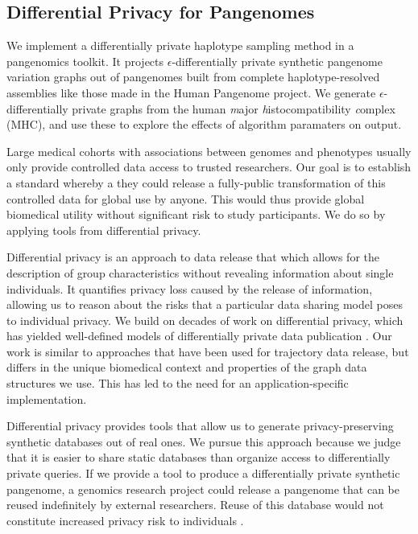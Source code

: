 \subsection{Differential Privacy for Pangenomes}
We implement a differentially private haplotype sampling method in a pangenomics toolkit. 
It projects $\epsilon$-differentially private synthetic pangenome variation graphs out of pangenomes built from complete haplotype-resolved assemblies like those made in the Human Pangenome project. 
We generate $\epsilon$-differentially private graphs from the human \textit{m}ajor \textit{h}istocompatibility \textit{c}omplex (MHC), and use these to explore the effects of algorithm paramaters on output.

Large medical cohorts with associations between genomes and phenotypes usually only provide controlled data access to trusted researchers. Our goal is to establish a standard whereby a they could release a fully-public transformation of this controlled data for global use by anyone. This would thus provide global biomedical utility without significant risk to study participants. We do so by applying tools from differential privacy.

Differential privacy is an approach to data release that which allows for the description of group characteristics without revealing information about single individuals. It quantifies privacy loss caused by the release of information, allowing us to reason about the risks that a particular data sharing model poses to individual privacy. We build on decades of work on differential privacy, which has yielded well-defined models of differentially private data publication \cite{dwork2014}. Our work is similar to approaches that have been used for trajectory data release, but differs in the unique biomedical context and properties of the graph data structures we use. This has led to the need for an application-specific implementation.

Differential privacy provides tools that allow us to generate privacy-preserving synthetic databases out of real ones. We pursue this approach because we judge that it is easier to share static databases than organize access to differentially private queries. If we provide a tool to produce a differentially private synthetic pangenome, a genomics research project could release a pangenome that can be reused indefinitely by external researchers. Reuse of this database would not constitute increased privacy risk to individuals \cite{dwork2014}.
